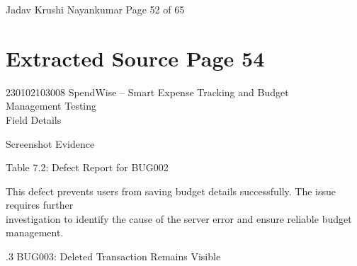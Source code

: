\documentclass[12pt,a4paper]{report}
\begin{document}
\smallskip

\smallskip

\smallskip

\smallskip
Jadav Krushi Nayankumar                                                          Page 52 of 65\\ 

\clearpage
\section*{Extracted Source Page 54}
230102103008                           SpendWise – Smart Expense Tracking and Budget\\ 
Management Testing\\ 

\smallskip
Field                 Details\\ 

\smallskip

\smallskip

\smallskip

\smallskip
Screenshot Evidence\\ 

\smallskip

\smallskip

\smallskip

\smallskip
Table 7.2: Defect Report for BUG002\\ 

\smallskip

\smallskip
This defect prevents users from saving budget details successfully. The issue requires further\\ 
investigation to identify the cause of the server error and ensure reliable budget management.\\ 

\smallskip

.3 BUG003: Deleted Transaction Remains Visible\\ 

\smallskip
\end{document}
